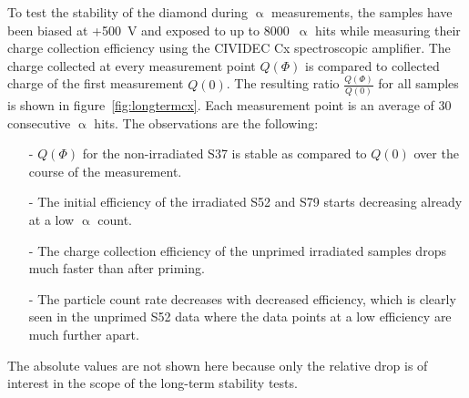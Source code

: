 
To test the stability of the diamond during $\upalpha$ measurements, the samples have been biased at +500~V and exposed to up to 8000~$\upalpha$ hits while measuring their charge collection efficiency using the CIVIDEC Cx spectroscopic amplifier. The charge collected at every measurement point $Q(\Phi)$ is compared to collected charge of the first measurement $Q(0)$. The resulting ratio $\frac{Q(\Phi)}{Q(0)}$ for all samples is shown in figure~\ref{fig:longtermcx}. Each measurement point is an average of 30 consecutive $\upalpha$ hits. The observations are the following:
\begin{itemize}
\item[-] $Q(\Phi)$ for the non-irradiated S37 is stable as compared to $Q(0)$ over the course of the measurement.
\item[-] The initial efficiency of the irradiated S52 and S79 starts decreasing already at a low $\upalpha$ count.
\item[-] The charge collection efficiency of the unprimed irradiated samples drops much faster than after priming.
\item[-] The particle count rate decreases with decreased efficiency, which is clearly seen in the unprimed S52 data where the data points at a low efficiency are much further apart.
\end{itemize}
The absolute values are not shown here because only the relative drop is of interest in the scope of the long-term stability tests.

